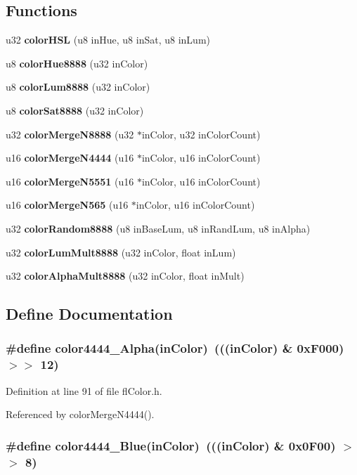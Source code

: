 \subsection*{Functions}
\begin{CompactItemize}
\item 
u32 {\bf color\-HSL} (u8 in\-Hue, u8 in\-Sat, u8 in\-Lum)
\item 
u8 {\bf color\-Hue8888} (u32 in\-Color)
\item 
u8 {\bf color\-Lum8888} (u32 in\-Color)
\item 
u8 {\bf color\-Sat8888} (u32 in\-Color)
\item 
u32 {\bf color\-Merge\-N8888} (u32 $\ast$in\-Color, u32 in\-Color\-Count)
\item 
u16 {\bf color\-Merge\-N4444} (u16 $\ast$in\-Color, u16 in\-Color\-Count)
\item 
u16 {\bf color\-Merge\-N5551} (u16 $\ast$in\-Color, u16 in\-Color\-Count)
\item 
u16 {\bf color\-Merge\-N565} (u16 $\ast$in\-Color, u16 in\-Color\-Count)
\item 
u32 {\bf color\-Random8888} (u8 in\-Base\-Lum, u8 in\-Rand\-Lum, u8 in\-Alpha)
\item 
u32 {\bf color\-Lum\-Mult8888} (u32 in\-Color, float in\-Lum)
\item 
u32 {\bf color\-Alpha\-Mult8888} (u32 in\-Color, float in\-Mult)
\end{CompactItemize}


\subsection{Define Documentation}
\subsubsection{\setlength{\rightskip}{0pt plus 5cm}\#define color4444\_\-Alpha(in\-Color)~(((in\-Color) \& 0x\-F000) $>$$>$ 12)}\label{flColor_8h_627833325c4dd9a07fd3dbf14c6ca250}




Definition at line 91 of file fl\-Color.h.

Referenced by color\-Merge\-N4444().
\subsubsection{\setlength{\rightskip}{0pt plus 5cm}\#define color4444\_\-Blue(in\-Color)~(((in\-Color) \& 0x0F00) $>$$>$ 8)}\label{flColor_8h_9278fe56f05e764daf41388c27a2373a}




